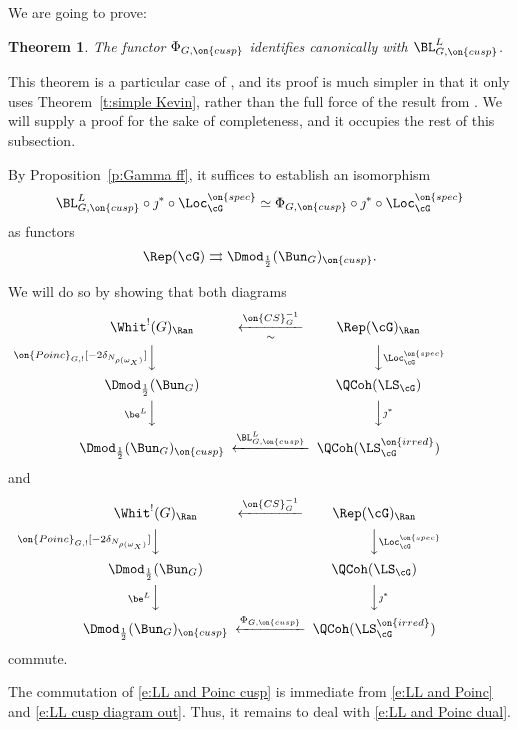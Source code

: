 \documentclass[9pt]{amsart}
\newtheorem{thm}[subsubsection]{Theorem}
\theoremstyle{remark}
\theoremstyle{definition}
\theoremstyle{remark}
\newcommand{\thmref}[1]{Theorem~\ref{#1}}
\newcommand{\propref}[1]{Proposition~\ref{#1}}
\numberwithin{equation}{section}
\begin{document}
\sssec{}

We are going to prove:

\begin{thm} \label{t:left adj as dual}
The functor $\Phi_{G,\on{cusp}}$ identifies canonically with $\BL^L_{G,\on{cusp}}$.
\end{thm}

This theorem is a particular case of \cite[Theorem 16.2.3]{GLC3}, and its proof is much simpler in that it only uses
\thmref{t:simple Kevin}, rather than the full force of the result from \cite{Lin}. We will supply a proof for the sake of
completeness, and it occupies the rest of this subsection.  

\sssec{}

By \propref{p:Gamma ff}, it suffices to establish an isomorphism 
$$\BL^L_{G,\on{cusp}} \circ \jmath^*\circ \Loc^{\on{spec}}_\cG \simeq \Phi_{G,\on{cusp}} \circ \jmath^*\circ \Loc^{\on{spec}}_\cG$$
as functors 
$$\Rep(\cG)\rightrightarrows  \Dmod_{\frac{1}{2}}(\Bun_G)_{\on{cusp}}.$$

We will do so by showing that both diagrams
\begin{equation} \label{e:LL and Poinc cusp}
\CD
\Whit^!(G)_\Ran @<{\on{CS}^{-1}_G}<{\sim}<  \Rep(\cG)_\Ran \\
@V{\on{Poinc}_{G,!}[-2\delta_{N_{\rho(\omega_X)}}]}VV @VV{\Loc^{\on{spec}}_\cG}V \\
\Dmod_{\frac{1}{2}}(\Bun_G) & & \QCoh(\LS_\cG) \\
@V{\be^L}VV @VV{\jmath^*}V  \\
\Dmod_{\frac{1}{2}}(\Bun_G)_{\on{cusp}} @<{\BL^L_{G,\on{cusp}}}<< \QCoh(\LS^{\on{irred}}_\cG)
\endCD
\end{equation} 
and 
\begin{equation} \label{e:LL and Poinc dual}
\CD
\Whit^!(G)_\Ran @<{\on{CS}^{-1}_G}<<  \Rep(\cG)_\Ran \\
@V{\on{Poinc}_{G,!}[-2\delta_{N_{\rho(\omega_X)}}]}VV @VV{\Loc^{\on{spec}}_\cG}V \\
\Dmod_{\frac{1}{2}}(\Bun_G) & & \QCoh(\LS_\cG) \\
@V{\be^L}VV @VV{\jmath^*}V  \\
\Dmod_{\frac{1}{2}}(\Bun_G)_{\on{cusp}} @<{\Phi_{G,\on{cusp}}}<< \QCoh(\LS^{\on{irred}}_\cG)
\endCD
\end{equation} 
commute.

\sssec{}

The commutation of \eqref{e:LL and Poinc cusp} is immediate from \eqref{e:LL and Poinc} and 
\eqref{e:LL cusp diagram out}. Thus, it remains to
deal with \eqref{e:LL and Poinc dual}. 
\end{document}

